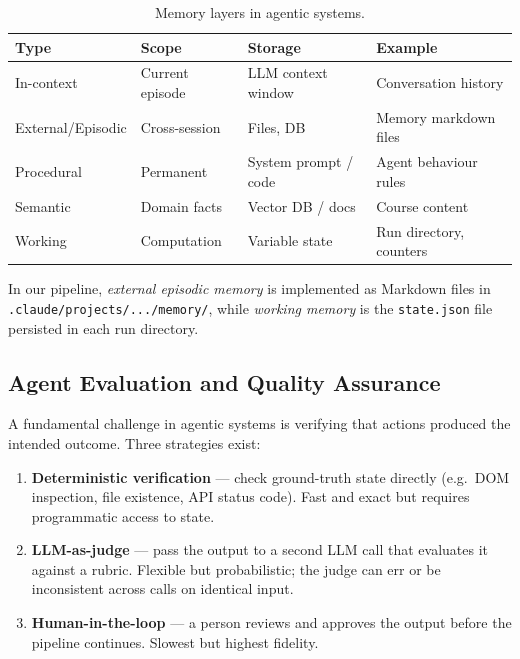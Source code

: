 \documentclass[12pt,a4paper]{article}
\begin{document}
\begin{table}[h]
\centering
\small
\begin{tabular}{@{}llll@{}}
\toprule
\textbf{Type} & \textbf{Scope} & \textbf{Storage} & \textbf{Example} \\
\midrule
In-context    & Current episode & LLM context window & Conversation history \\
External/Episodic & Cross-session & Files, DB & Memory markdown files \\
Procedural    & Permanent & System prompt / code & Agent behaviour rules \\
Semantic      & Domain facts & Vector DB / docs & Course content \\
Working       & Computation & Variable state & Run directory, counters \\
\bottomrule
\end{tabular}
\caption{Memory layers in agentic systems.}
\end{table}

In our pipeline, \emph{external episodic memory} is implemented as Markdown files
in \texttt{.claude/projects/.../memory/}, while \emph{working memory} is the
\texttt{state.json} file persisted in each run directory.

\subsection{Agent Evaluation and Quality Assurance}
\label{sec:agentqa}

A fundamental challenge in agentic systems is verifying that actions produced
the intended outcome. Three strategies exist:

\begin{enumerate}[leftmargin=2em]
  \item \textbf{Deterministic verification} — check ground-truth state directly
        (e.g.\ DOM inspection, file existence, API status code). Fast and exact
        but requires programmatic access to state.
  \item \textbf{LLM-as-judge} — pass the output to a second LLM call that
        evaluates it against a rubric. Flexible but probabilistic; the judge
        can err or be inconsistent across calls on identical input.
  \item \textbf{Human-in-the-loop} — a person reviews and approves the output
        before the pipeline continues. Slowest but highest fidelity.
\end{enumerate}
\end{document}
